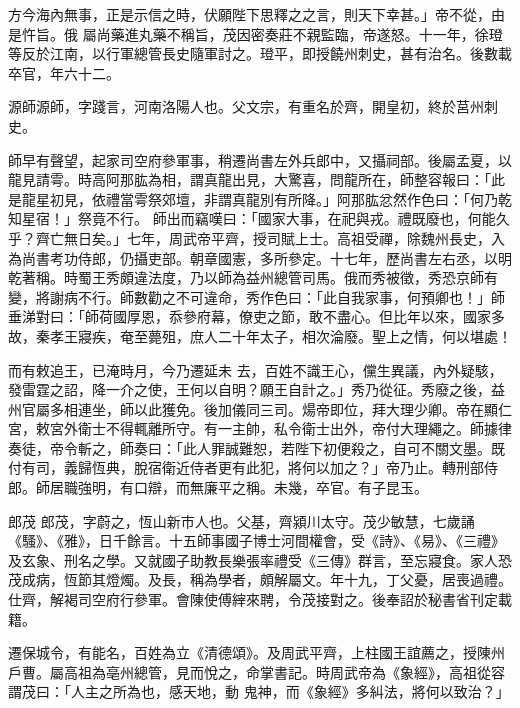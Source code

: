 \begin{pinyinscope}
 方今海內無事，正是示信之時，伏願陛下思釋之之言，則天下幸甚。」帝不從，由是忤旨。俄
 屬尚藥進丸藥不稱旨，茂因密奏莊不親監臨，帝遂怒。十一年，徐璒等反於江南，以行軍總管長史隨軍討之。璒平，即授饒州刺史，甚有治名。後數載卒官，年六十二。



 源師源師，字踐言，河南洛陽人也。父文宗，有重名於齊，開皇初，終於莒州刺史。



 師早有聲望，起家司空府參軍事，稍遷尚書左外兵郎中，又攝祠部。後屬孟夏，以龍見請雩。時高阿那肱為相，謂真龍出見，大驚喜，問龍所在，師整容報曰：「此是龍星初見，依禮當雩祭郊壇，非謂真龍別有所降。」阿那肱忿然作色曰：「何乃乾知星宿！」祭竟不行。
 師出而竊嘆曰：「國家大事，在祀與戎。禮既廢也，何能久乎？齊亡無日矣。」七年，周武帝平齊，授司賦上士。高祖受禪，除魏州長史，入為尚書考功侍郎，仍攝吏部。朝章國憲，多所參定。十七年，歷尚書左右丞，以明乾著稱。時蜀王秀頗違法度，乃以師為益州總管司馬。俄而秀被徵，秀恐京師有變，將謝病不行。師數勸之不可違命，秀作色曰：「此自我家事，何預卿也！」師垂涕對曰：「師荷國厚恩，忝參府幕，僚吏之節，敢不盡心。但比年以來，國家多故，秦孝王寢疾，奄至薨殂，庶人二十年太子，相次淪廢。聖上之情，何以堪處！



 而有敕追王，已淹時月，今乃遷延未
 去，百姓不識王心，儻生異議，內外疑駭，發雷霆之詔，降一介之使，王何以自明？願王自計之。」秀乃從征。秀廢之後，益州官屬多相連坐，師以此獲免。後加儀同三司。煬帝即位，拜大理少卿。帝在顯仁宮，敕宮外衛士不得輒離所守。有一主帥，私令衛士出外，帝付大理繩之。師據律奏徒，帝令斬之，師奏曰：「此人罪誠難恕，若陛下初便殺之，自可不關文墨。既付有司，義歸恆典，脫宿衛近侍者更有此犯，將何以加之？」帝乃止。轉刑部侍郎。師居職強明，有口辯，而無廉平之稱。未幾，卒官。有子昆玉。



 郎茂
 郎茂，字蔚之，恆山新市人也。父基，齊潁川太守。茂少敏慧，七歲誦《騷》、《雅》，日千餘言。十五師事國子博士河間權會，受《詩》、《易》、《三禮》及玄象、刑名之學。又就國子助教長樂張率禮受《三傳》群言，至忘寢食。家人恐茂成病，恆節其燈燭。及長，稱為學者，頗解屬文。年十九，丁父憂，居喪過禮。仕齊，解褐司空府行參軍。會陳使傅縡來聘，令茂接對之。後奉詔於秘書省刊定載籍。



 遷保城令，有能名，百姓為立《清德頌》。及周武平齊，上柱國王誼薦之，授陳州戶曹。屬高祖為亳州總管，見而悅之，命掌書記。時周武帝為《象經》，高祖從容謂茂曰：「人主之所為也，感天地，動
 鬼神，而《象經》多糾法，將何以致治？」




\end{pinyinscope}
